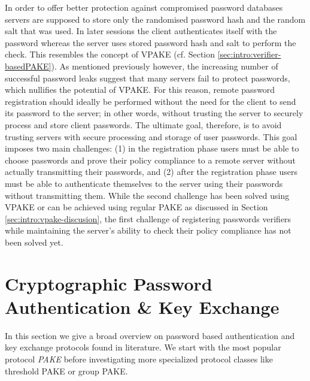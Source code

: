 In order to offer better protection against compromised password databases servers are supposed to store only the randomised password hash and the random salt that was used.
In later sessions the client authenticates itself with the password whereas the server uses stored password hash and salt to perform the check.
This resembles the concept of \ac{VPAKE} (cf. Section \ref{sec:intro:verifier-basedPAKE}).
As mentioned previously however, the increasing number of successful password leaks suggest that many servers fail to protect passwords, which nullifies the potential of \ac{VPAKE}.
For this reason, remote password registration should ideally be performed without the need for the client to send its password to the server; in other words, without trusting the server to securely process and store client passwords.
The ultimate goal, therefore, is to avoid trusting servers with secure processing and storage of user passwords.
This goal imposes two main challenges:
(1) in the registration phase users must be able to choose passwords and prove their policy compliance to a remote server without actually transmitting their passwords, and 
(2) after the registration phase users must be able to authenticate themselves to the server using their passwords without transmitting them.
While the second challenge has been solved using \ac{VPAKE} or can be achieved using regular \ac{PAKE} as discussed in Section \ref{sec:intro:vpake-discusion}, the first challenge of registering passwords verifiers while maintaining the server's ability to check their policy compliance has not been solved yet.




\section{Cryptographic Password Authentication \& Key Exchange}
In this section we give a broad overview on password based authentication and key exchange protocols found in literature.
We start with the most popular protocol \emph{\ac{PAKE}} before investigating more specialized protocol classes like threshold \ac{PAKE} or group \ac{PAKE}.

